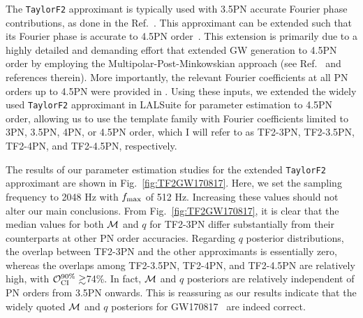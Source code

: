 \documentclass[aps,prd,twocolumn,superscriptaddress,groupedaddress,nofootinbib,showpacs,eqsecnum,useAms]{revtex4-2}
\begin{document}
The \texttt{TaylorF2} approximant is typically used with 3.5PN accurate Fourier phase contributions, as done in the Ref.~\cite{BIOPS}. This approximant can be extended such that its Fourier phase is accurate to 4.5PN order~\cite{B45PN_23}. This extension is primarily due to a highly detailed and demanding effort that extended 
GW generation to 4.5PN order by employing the Multipolar-Post-Minkowskian approach (see Ref.~\cite{blanchet2024, B45PN_23}
and references therein). More importantly, the relevant Fourier coefficients at all PN orders up to 4.5PN were provided in \cite{B45PN_23}. Using these inputs, we extended the widely used \texttt{TaylorF2} approximant in LALSuite for parameter estimation to 4.5PN order, allowing us to use the template family with Fourier coefficients limited to 3PN, 3.5PN, 4PN, or 4.5PN order, which I will refer to as TF2-3PN, TF2-3.5PN, TF2-4PN, and TF2-4.5PN, respectively.

The results of our parameter estimation studies for the extended \texttt{TaylorF2} approximant are shown in Fig.~\ref{fig:TF2GW170817}. Here, we set the sampling frequency to 2048 Hz with $f_{\rm max}$ of 512 Hz. Increasing these values should not alter our main conclusions. From Fig.~\ref{fig:TF2GW170817}, it is clear that the median values for both ${\cal M}$ and $q$ for TF2-3PN differ substantially from their counterparts at other PN order accuracies. 
Regarding $q$ posterior distributions, the overlap between TF2-3PN and the other approximants is essentially zero, whereas the overlaps among TF2-3.5PN, TF2-4PN, and TF2-4.5PN are relatively high, with ${\cal O}_{\rm CI}^{90\%}\gtrsim$74\%.
In fact, ${\cal M}$ and $q$ posteriors are relatively independent of PN orders from 3.5PN onwards.
This is reassuring as our results indicate that the widely quoted ${\cal M}$ and $q$  posteriors for GW170817~\cite{GW170817pe} are indeed correct.
\end{document}
